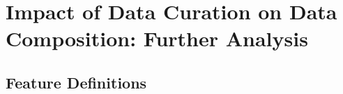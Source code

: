\documentclass{article}
\begin{document}




\clearpage
\vspace{-3mm}
\section{Impact of Data Curation on Data Composition: Further Analysis}
\label{sec:app-data-analysis}

\vspace{-3mm}
\subsection{Feature Definitions}
\end{document}
